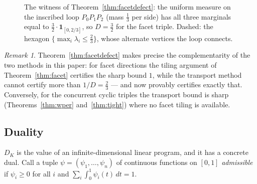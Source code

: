 \documentclass[11pt,reqno]{amsart}
\theoremstyle{plain}
\theoremstyle{definition}
\theoremstyle{remark}
\newtheorem{remark}[theorem]{Remark}
\begin{document}
\begin{figure}[ht]
\centering
{}
\caption{The witness of Theorem~\ref{thm:facetdefect}: the uniform measure on
the inscribed loop $P_0P_1P_2$ (mass $\tfrac13$ per side) has all three
marginals equal to $\tfrac32\cdot\mathbf1_{[0,2/3]}$, so $D=\tfrac32$ for the
facet triple. Dashed: the hexagon $\{\max_i\lambda_i\le\tfrac23\}$, whose
alternate vertices the loop connects.}
\label{fig:loop}
\end{figure}

\begin{remark}\label{rem:complement}
Theorem~\ref{thm:facetdefect} makes precise the complementarity of the two
methods in this paper: for facet directions the tiling argument of
Theorem~\ref{thm:facet} certifies the sharp bound $1$, while the transport
method cannot certify more than $1/D=\tfrac23$ --- and now provably certifies
exactly that. Conversely, for the concurrent cyclic triples the transport bound is
sharp (Theorems~\ref{thm:wper} and~\ref{thm:tight}) where no facet tiling is
available.
\end{remark}

\subsection*{Duality}
$D_K$ is the value of an infinite-dimensional linear program, and it has a
concrete dual. Call a tuple $\psi=(\psi_1,\dots,\psi_n)$ of continuous
functions on $[0,1]$ \emph{admissible} if $\psi_i\ge0$ for all $i$ and
$\sum_i\int_0^1\psi_i(t)\,dt=1$.
\end{document}
